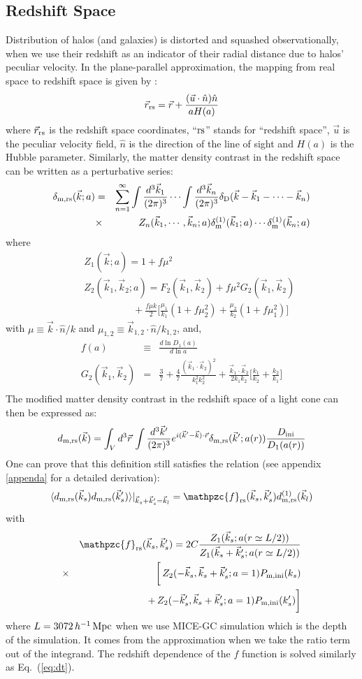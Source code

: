 \documentclass[prd,amsmath,amssymb,floatfix,superscriptaddress,nofootinbib,twocolumn]{revtex4-1}
\def\be{\begin{equation}}
\def\ee{\end{equation}}
\def\bea{\begin{eqnarray}}
\def\eea{\end{eqnarray}}
\newcommand{\m}{\rm m}
\newcommand{\rs}{\rm rs}
\newcommand{\ini}{\rm ini}
\newcommand{\vrr}{\vec{r}}
\newcommand{\vs}{\nonumber\\}
\newcommand{\vk}{\vec{k}}
\newcommand{\ec}[1]{Eq.~(\ref{eq:#1})}
\newcommand{\eql}[1]{\label{eq:#1}}
\begin{document}
\subsection{Redshift Space} \label{sec7}
Distribution of halos (and galaxies) is distorted and squashed observationally, when we use their redshift as an indicator of their radial distance due to halos' peculiar velocity. In the plane-parallel approximation, the mapping from real space to redshift space is given by \cite{Bernardeau:2002rev}:
\be 
\vrr_{\rs} = \vrr + \frac{(\vec{u}\cdot \hat{n})\hat{n}}{aH(a)}
\ee 
where $\vrr_{\rs}$ is the redshift space coordinates, ``$\rs$'' stands for ``redshift space'', $\vec{u}$ is the peculiar velocity field, $\hat{n}$ is the direction of the line of sight and $H(a)$ is the Hubble parameter. Similarly, the matter density contrast in the redshift space can be written as a perturbative series:
\bea 
\delta_{\m,\rs}(\vk;a)&=&\sum_{n=1}^{\infty} \int\frac{d^3 \vk_1}{(2\pi)^3} \cdots \int \frac{d^3 \vk_n}{(2\pi)^3} \delta_{\rm D}(\vk-\vk_1 - \cdots -\vk_n) \nonumber \\
&\times & Z_n (\vk_1,\cdots,\vk_n;a)\delta_{\m}^{(1)}(\vk_1;a)\cdots \delta_{\m}^{(1)}(\vk_n;a) \eql{rspt} \vs
\eea
where 
\bea 
&&Z_1(\vk;a)=1+f\mu^2 \\ 
&&Z_2(\vk_1,\vk_2;a)=F_{2}(\vk_1,\vk_2)+f\mu^2 G_2(\vk_1,\vk_2)\vs 
&&\qquad \qquad\quad+\frac{f\mu k}{2}\bigg[ \frac{\mu_1}{k_1}(1+f\mu_2^2)+\frac{\mu_2}{k_2}(1+f\mu_1^2)\bigg]
\eea 
with $\mu \equiv \vk \cdot \hat{n}/k$ and $\mu_{1,2} \equiv \vk_{1,2} \cdot \hat{n}/k_{1,2}$, and,
\bea 
f(a)&\equiv & \frac{d \ln D_{1}(a)}{d \ln a}\\
G_2(\vk_1,\vk_2)&=&\frac{3}{7}+\frac{4}{7}\frac{(\vk_1\cdot \vk_2)^2}{k_1^2 k_2^2}+\frac{\vk_1\cdot \vk_2}{2k_1k_2}\bigg[\frac{k_1}{k_2}+\frac{k_2}{k_1}\bigg]\vs
\eea 
The modified matter density contrast in the redshift space of a light cone can then be expressed as: 
\be 
d_{\rm m,\rs}(\vk)=\int_{V} d^3\vrr  \, \int \frac{d^3 \vk'}{(2\pi)^3}e^{i(\vk'-\vk)\cdot\vrr}\delta_{\rm m,\rs}(\vk';a(r))\frac{D_{\ini}}{D_{1}(a(r))} 
\ee 
One can prove that this definition still satisfies the relation (see appendix \ref{appenda} for a detailed derivation):
\be 
\langle d_{\rm m,\rs }(\vk_s)d_{\rm m,\rs }(\vk_s') \rangle|_{\vk_s+\vk_s'=\vk_l} =\mathpzc{f}_{\rs}(\vec{k}_s,\vec{k}_s'){d}^{(1)}_{\rm m,\rs}(\vec{k}_l) \eql{2ptddrs}
\ee 
with 
\bea
&&\mathpzc{f}_{\rs}(\vec{k}_s,\vec{k}_s')=2C\frac{Z_{1}(\vk_s;a(r\simeq L/2 ))}{Z_{1}(\vk_s+\vk_s';a(r\simeq L/2 ))}\vs
&\times&\bigg[\,Z_2(-\vec{k}_s,\vec{k}_s+\vec{k}_s';a=1)P_{\rm m,ini}(k_s)\vs
&&+\,Z_2(-\vec{k}_s',\vec{k}_s+\vec{k}_s';a=1)P_{\rm m,ini}(k_s')\bigg]  \vs   
\eea 
where $L=3072\, h^{-1}\, \rm Mpc$ when we use MICE-GC simulation which is the depth of the simulation. It comes from the approximation when we take the ratio term out of the integrand. The redshift dependence of the $f$ function is solved similarly as \ec{dt}. 
\end{document}

